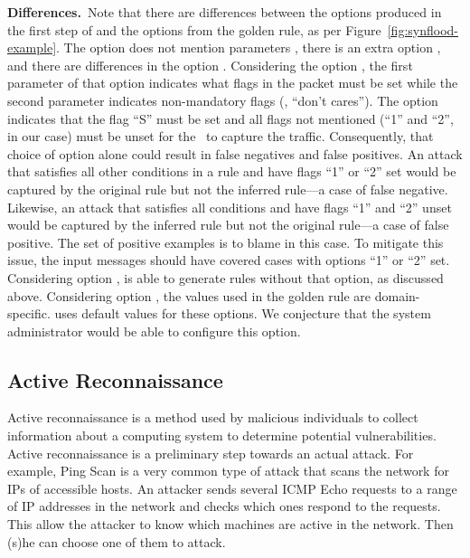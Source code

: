 \documentclass[sigconf,review, anonymous]{acmart}
\begin{document}
\vspace{1ex}
\noindent
\textbf{Differences.}~Note that there are differences between the
options produced in the first step of \tname{} and the options from
the golden rule, as per Figure~\ref{fig:synflood-example}. The option
 does not mention parameters , there is an
extra option , and there are differences in the option
. Considering the option , the first
parameter of that option indicates what flags in the packet must be
set while the second parameter indicates non-mandatory flags (\ie{},
``don't cares''). The option  indicates that the flag
``S'' must be set and all flags not mentioned (``1'' and ``2'', in our
case) must be unset for the \nids\ to capture the
traffic. Consequently, that choice of option alone could result in
false negatives and false positives. An attack that satisfies all
other conditions in a rule and have flags ``1'' or ``2'' set would be
captured by the original rule but not the inferred rule---a case of
false negative. Likewise, an attack that satisfies all conditions and
have flags ``1'' and ``2'' unset would be captured by the inferred
rule but not the original rule---a case of false positive. The set of
positive examples is to blame in this case. To mitigate this issue,
the input messages should have covered cases with options ``1'' or
``2'' set. Considering option , \tname{} is able
to generate rules without that option, as discussed above. Considering
option , the values used in the golden rule are
domain-specific. \tname{} uses default values for these options. We
conjecture that the system administrator would be able to configure
this option.


\subsection{Active Reconnaissance}
\label{sec:active-recon}



Active reconnaissance is a method used by malicious individuals to
collect information about a computing system to determine potential
vulnerabilities. Active reconnaissance is a preliminary step towards
an actual attack. For example, Ping Scan is a very common type of
attack that scans the network for IPs of accessible hosts. An attacker
sends several ICMP Echo requests to a range of IP addresses in the
network and checks which ones respond to the requests. This allow the
attacker to know which machines are active in the network. Then (s)he
can choose one of them to attack.
\end{document}
